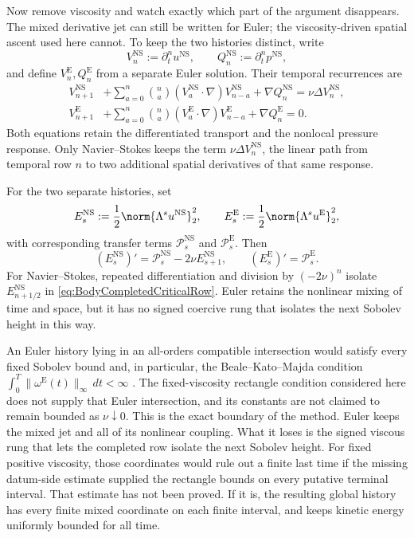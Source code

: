 Now remove viscosity and watch exactly which part of the argument disappears.  The
mixed derivative jet can still be written for Euler; the viscosity-driven spatial
ascent used here cannot.
To keep the two histories distinct, write
\[
  V_n^{\mathrm{NS}}:=\partial_t^nu^{\mathrm{NS}},
  \qquad
  Q_n^{\mathrm{NS}}:=\partial_t^np^{\mathrm{NS}},
\]
and define \(V_n^{\mathrm E},Q_n^{\mathrm E}\) from a separate Euler solution.
Their temporal recurrences are
\begin{align}
  V_{n+1}^{\mathrm{NS}}
  &+
  \sum_{a=0}^{n}\binom{n}{a}
  (V_a^{\mathrm{NS}}\cdot\nabla)V_{n-a}^{\mathrm{NS}}
  +\nabla Q_n^{\mathrm{NS}}
  =\nu\Delta V_n^{\mathrm{NS}},
  \label{eq:NSTemporalRecurrenceComparison}
  \\
  V_{n+1}^{\mathrm E}
  &+
  \sum_{a=0}^{n}\binom{n}{a}
  (V_a^{\mathrm E}\cdot\nabla)V_{n-a}^{\mathrm E}
  +\nabla Q_n^{\mathrm E}
  =0.
  \label{eq:EulerTemporalRecurrenceComparison}
\end{align}
Both equations retain the differentiated transport and the nonlocal pressure response.
Only Navier--Stokes keeps the term \(\nu\Delta V_n^{\mathrm{NS}}\), the linear path
from temporal row \(n\) to two additional spatial derivatives of that same response.

For the two separate histories, set
\[
  E_s^{\mathrm{NS}}:=\frac12\norm{\Lambda^su^{\mathrm{NS}}}_2^2,
  \qquad
  E_s^{\mathrm E}:=\frac12\norm{\Lambda^su^{\mathrm E}}_2^2,
\]
with corresponding transfer terms \(\mathcal P_s^{\mathrm{NS}}\) and \(\mathcal P_s^{\mathrm E}\).
Then
\begin{equation}\label{eq:NSEulerEnergyComparison}
  (E_s^{\mathrm{NS}})'
  =\mathcal P_s^{\mathrm{NS}}-2\nu E_{s+1}^{\mathrm{NS}},
  \qquad
  (E_s^{\mathrm E})'
  =\mathcal P_s^{\mathrm E}.
\end{equation}
For Navier--Stokes, repeated differentiation and division by \((-2\nu)^n\) isolate \(E_{n+1/2}^{\mathrm{NS}}\) in \eqref{eq:BodyCompletedCriticalRow}.
Euler retains the nonlinear mixing of time and space, but it has no signed coercive rung that isolates the next Sobolev height in this way.

An Euler history lying in an all-orders compatible intersection would satisfy every
fixed Sobolev bound and, in particular, the Beale--Kato--Majda condition
\(\int_0^T\|\omega^{\mathrm E}(t)\|_\infty\,dt<\infty\)
\parencite{BealeKatoMajda1984}.
The fixed-viscosity rectangle condition considered here does not supply that Euler
intersection, and its constants are not claimed to remain bounded as \(\nu\downarrow0\).
This is the exact boundary of the method.  Euler keeps the mixed jet and all of its
nonlinear coupling.  What it loses is the signed viscous rung that lets the completed
row isolate the next Sobolev height.
For fixed positive viscosity, those coordinates would rule out a finite last time if the
missing datum-side estimate supplied the rectangle bounds on every putative terminal
interval.  That estimate has not been proved.  If it is, the resulting global history
has every finite mixed coordinate on each finite interval, and
 keeps kinetic energy uniformly bounded for
all time.
